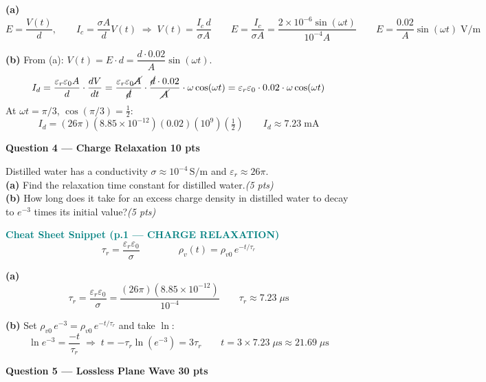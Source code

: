 \documentclass[11pt,letterpaper]{article}
\begin{document}
\textbf{(a)}
\[E=\frac{V(t)}{d},\qquad I_c=\frac{\sigma A}{d}V(t)\;\Rightarrow\;V(t)=\frac{I_c\,d}{\sigma A}
\qquad E=\frac{I_c}{\sigma A}=\frac{2\times10^{-6}\sin(\omega t)}{10^{-4}A}
\qquad\boxed{E=\frac{0.02}{A}\sin(\omega t)\;\text{V/m}}\]

\textbf{(b)} From (a): $V(t)=E\cdot d=\dfrac{d\cdot0.02}{A}\sin(\omega t)$.
\[I_d=\frac{\varepsilon_r\varepsilon_0 A}{d}\cdot\frac{dV}{dt}
=\frac{\varepsilon_r\varepsilon_0\cancel{A}}{\cancel{d}}\cdot\frac{\cancel{d}\cdot0.02}{\cancel{A}}\cdot\omega\cos(\omega t)
=\varepsilon_r\varepsilon_0\cdot0.02\cdot\omega\cos(\omega t)\]
At $\omega t=\pi/3$, $\cos(\pi/3)=\tfrac{1}{2}$:
\[I_d=(26\pi)(8.85\times10^{-12})(0.02)(10^9)\!\left(\tfrac{1}{2}\right)
\qquad\boxed{I_d\approx7.23\;\text{mA}}\]

\newpage
\colorbox{coralbg}{\parbox{\dimexpr\linewidth-2\fboxsep}{\color{coral}\large\textbf{Question 4 --- Charge Relaxation \hfill 10 pts}}}

\begin{qbox}
Distilled water has a conductivity $\sigma\approx10^{-4}\,\text{S/m}$ and $\varepsilon_r\approx26\pi$.\\[4pt]
\textbf{(a)} Find the relaxation time constant for distilled water.\hfill\textit{(5 pts)}\\[3pt]
\textbf{(b)} How long does it take for an excess charge density in distilled water to decay to $e^{-3}$ times its initial value?\hfill\textit{(5 pts)}
\end{qbox}

\begin{cssnip}
\textbf{\small\textcolor{teal}{Cheat Sheet Snippet (p.1 --- CHARGE RELAXATION)}}
\[\tau_r=\frac{\varepsilon_r\varepsilon_0}{\sigma}\qquad\qquad\rho_v(t)=\rho_{v0}\,e^{-t/\tau_r}\]
\end{cssnip}

\textbf{(a)}
\[\tau_r=\frac{\varepsilon_r\varepsilon_0}{\sigma}=\frac{(26\pi)(8.85\times10^{-12})}{10^{-4}}
\qquad\boxed{\tau_r\approx7.23\;\mu\text{s}}\]

\textbf{(b)} Set $\rho_{v0}\,e^{-3}=\rho_{v0}\,e^{-t/\tau_r}$ and take $\ln$:
\[\ln e^{-3}=\frac{-t}{\tau_r}\;\Rightarrow\;t=-\tau_r\ln(e^{-3})=3\tau_r
\qquad\boxed{t=3\times7.23\;\mu\text{s}\approx21.69\;\mu\text{s}}\]

\newpage
\colorbox{purplebg}{\parbox{\dimexpr\linewidth-2\fboxsep}{\color{purple}\large\textbf{Question 5 --- Lossless Plane Wave \hfill 30 pts}}}
\end{document}
